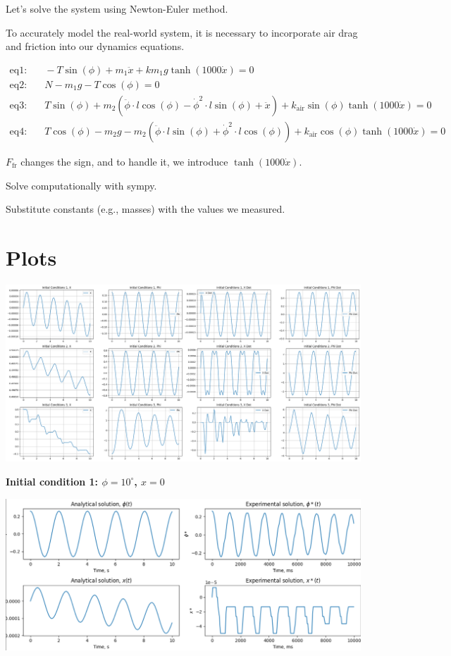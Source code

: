 \documentclass{article}
\begin{document}
Let's solve the system using Newton-Euler method.

To accurately model the real-world system, it is necessary to incorporate air drag and friction into our dynamics equations.

\begin{align*}
  \text{eq1:} & \quad -T \sin(\phi) + m_1 \ddot{x} + k m_1 g \tanh(1000 \dot{x}) = 0 \\
  \text{eq2:} & \quad N - m_1 g - T \cos(\phi) = 0 \\
  \text{eq3:} & \quad T \sin(\phi) + m_2 \left(\ddot{\phi} \cdot l \cos(\phi) - \dot{\phi}^2 \cdot l \sin(\phi) + \ddot{x}\right) + k_{\text{air}} \sin(\phi) \tanh(1000 \dot{x}) = 0 \\
  \text{eq4:} & \quad T \cos(\phi) - m_2 g - m_2 \left(\ddot{\phi} \cdot l \sin(\phi) + \dot{\phi}^2 \cdot l \cos(\phi)\right) + k_{\text{air}} \cos(\phi) \tanh(1000 \dot{x}) = 0
\end{align*}
  
$F_\text{fr}$ changes the sign, and to handle it, we introduce $\tanh(1000 \dot{x})$.

Solve computationally with sympy.

Substitute constants (e.g., masses) with the values we measured.

\section{Plots}
\includegraphics*[scale=0.25]{graphics/results.png}

\textbf{Initial condition 1: $\phi = 10^\circ$, $x = 0$}

\includegraphics*[scale=0.25]{graphics/res_comparison_init1.png}
\end{document}
